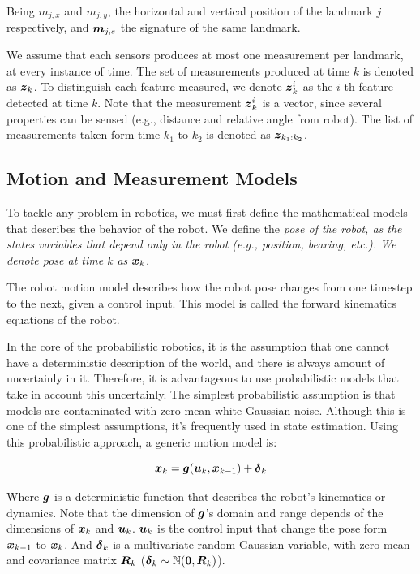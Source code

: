 Being $m_{j,x}$ and $m_{j,y}$, the horizontal and vertical position of the landmark $j$ respectively, and $\boldsymbol{m}_{j,s}$ the signature of the same landmark.

We assume that each sensors produces at most one measurement per landmark, at every instance of time. The set of measurements produced at time $k$ is denoted as $\boldsymbol{z}_k$. To distinguish each feature measured, we denote $\boldsymbol{z}_k^i$ as the $i$-th feature detected at time $k$. Note that the measurement $\boldsymbol{z}_k^i$ is a vector, since several properties can be sensed (e.g., distance and relative angle from robot). The list of measurements taken form time $k_1$ to $k_2$ is denoted as $\boldsymbol{z}_{k_1:k_2}$.

\subsection{Motion and Measurement Models}

To tackle any problem in robotics, we must first define the mathematical models that describes the behavior of the robot. We define the \it{pose} of the robot, as the states variables that depend only in the robot (e.g., position, bearing, etc.). We denote pose at time $k$ as $\boldsymbol{x}_k$. 

The robot motion model describes how the robot pose changes from one timestep to the next, given a control input. This model is called the forward kinematics equations of the robot.

In the core of the probabilistic robotics, it is the assumption that one cannot have a deterministic description of the world, and there is always amount of uncertainly in it. Therefore, it is advantageous to use probabilistic models that take in account this uncertainly. The simplest probabilistic assumption is that models are contaminated with zero-mean white Gaussian noise. Although this is one of the simplest assumptions, it's frequently used in state estimation. Using this probabilistic approach, a generic motion model is:

\begin{equation}
\boldsymbol{x}_k = \boldsymbol{g}(\boldsymbol{u}_k, \boldsymbol{x}_{k-1}) + \boldsymbol{\delta}_k
\end{equation}    

Where $\boldsymbol{g}$ is a deterministic function that describes the robot's kinematics or dynamics. Note that the dimension of $\boldsymbol{g}$'s  domain and range depends of the dimensions of $\boldsymbol{x}_k$ and $\boldsymbol{u}_k$. $\boldsymbol{u}_k$ is the control input that change the pose form $\boldsymbol{x}_{k-1}$ to $\boldsymbol{x}_k$. And $\boldsymbol{\delta}_k$ is a multivariate random Gaussian variable, with zero mean and covariance matrix $\boldsymbol{R}_k$ ($\boldsymbol{\delta}_k \sim \mathbb{N}(\boldsymbol{0},\boldsymbol{R}_k)$).


